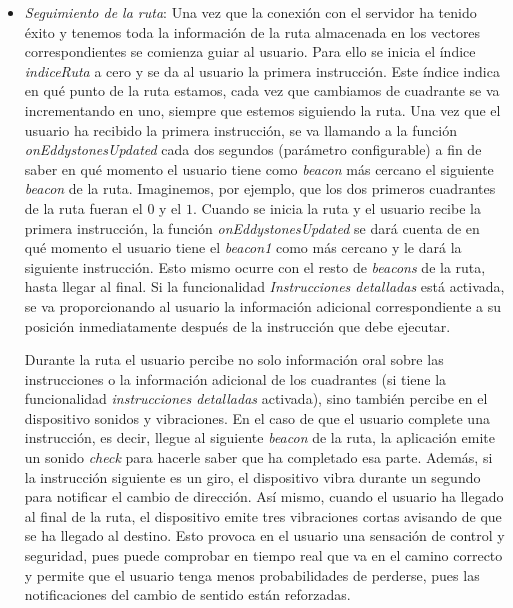 \begin{itemize}
	
	\item \textit{Seguimiento de la ruta}: Una vez que la conexión con el servidor ha tenido éxito y tenemos toda la información de la ruta almacenada en los vectores correspondientes se comienza guiar al usuario. Para ello se inicia el índice \textit{indiceRuta} a cero y se da al usuario la primera instrucción. Este índice indica en qué punto de la ruta estamos, cada vez que cambiamos de cuadrante se va incrementando en uno, siempre que estemos siguiendo la ruta. Una vez que el usuario ha recibido la primera instrucción, se va llamando a la función \textit{onEddystonesUpdated} cada dos segundos (parámetro configurable) a fin de saber en qué momento el usuario tiene como \textit{beacon} más cercano el siguiente \textit{beacon} de la ruta. Imaginemos, por ejemplo, que los dos primeros cuadrantes de la ruta fueran el $0$ y el $1$. Cuando se inicia la ruta y el usuario recibe la primera instrucción, la función \textit{onEddystonesUpdated} se dará cuenta de en qué momento el usuario tiene el \textit{beacon1} como más cercano y le dará la siguiente instrucción. Esto mismo ocurre con el resto de \textit{beacons} de la ruta, hasta llegar al final. Si la funcionalidad \textit{Instrucciones detalladas} está activada, se va proporcionando al usuario la información adicional correspondiente a su posición inmediatamente después de la instrucción que debe ejecutar.
	
	Durante la ruta el usuario percibe no solo información oral sobre las instrucciones o la información adicional de los cuadrantes (si tiene la funcionalidad \textit{instrucciones detalladas} activada), sino también percibe en el dispositivo sonidos y vibraciones. En el caso de que el usuario complete una instrucción, es decir, llegue al siguiente \textit{beacon} de la ruta, la aplicación emite un sonido \textit{check} para hacerle saber que ha completado esa parte. Además, si la instrucción siguiente es un giro, el dispositivo vibra durante un segundo para notificar el cambio de dirección. Así mismo, cuando el usuario ha llegado al final de la ruta, el dispositivo emite tres vibraciones cortas avisando de que se ha llegado al destino. Esto provoca en el usuario una sensación de control y seguridad, pues puede comprobar en tiempo real que va en el camino correcto y permite que el usuario tenga menos probabilidades de perderse, pues las notificaciones del cambio de sentido están reforzadas.
	

\end{itemize}

